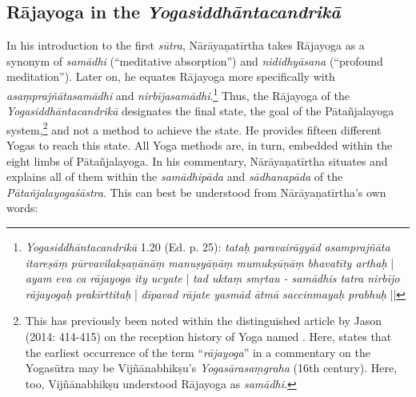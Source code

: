 \subsection{Rājayoga in the \emph{Yogasiddhāntacandrikā}}
\label{rajacandrika}
In his introduction to the first \textit{sūtra}, Nārāyaṇatīrtha takes Rājayoga as a synonym of \textit{samādhi} (``meditative absorption'') and \textit{nididhyāsana} (``profound meditation''). Later on, he equates Rājayoga more specifically with \textit{asaṃprajñātasamādhi} and \textit{nirbījasamādhi}.\footnote{\textit{Yogasiddhāntacandrikā} 1.20 (Ed. p. 25): \textit{tataḥ paravairāgyād asamprajñāta itareṣāṃ pūrvavilakṣaṇānāṃ manuṣyāṇāṃ mumukṣūṇāṃ bhavatīty arthaḥ} | \textit{ayam eva ca rājayoga ity ucyate} | \textit{tad uktaṃ smṛtau - samādhis tatra nirbījo rājayogaḥ prakīrttitaḥ} | \textit{dīpavad rājate yasmād ātmā saccinmayaḥ prabhuḥ} ||} Thus, the Rājayoga of the \emph{Yogasiddhāntacandrikā} designates the final state, the goal of the Pātañjalayoga system,\footnote{This has previously been noted within the distinguished article by Jason \citeauthor{birch2014} (2014: 414-415) on the reception history of Yoga named . Here, \citeauthor{birch2014} states that the earliest occurrence of the term ``\textit{rājayoga}'' in a commentary on the Yogasūtra may be Vijñānabhikṣu’s \textit{Yogasārasaṃgraha} (16th century). Here, too, Vijñānabhikṣu understood Rājayoga as \textit{samādhi}.} and not a method to achieve the state. He provides fifteen different Yogas to reach this state. All Yoga methods are, in turn, embedded within the eight limbs of Pātañjalayoga. In his commentary, Nārāyaṇatīrtha situates and explains all of them within the \textit{samādhipāda} and \textit{sādhanapāda} of the \emph{Pātañjalayogaśāstra}. This can best be understood from Nārāyaṇatīrtha's own words: 

